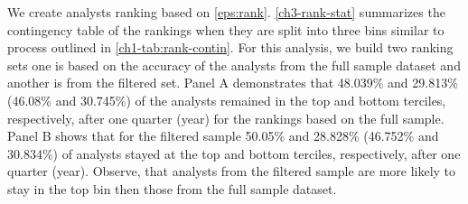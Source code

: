 We create analysts ranking  based on \vref{eps:rank}. \vref{ch3-rank-stat} summarizes the contingency table of the rankings when they are split into three bins similar to process outlined in \vref{ch1-tab:rank-contin}. For this analysis, we build two ranking sets one is based on the accuracy of the analysts from the full sample dataset and another is from the filtered set. Panel A demonstrates that 48.039\% and  29.813\% (46.08\% and  30.745\%) of the analysts  remained in the top and bottom terciles, respectively,  after one quarter (year) for the rankings based on the full sample. Panel B shows that for the filtered sample 50.05\% and  28.828\% (46.752\% and  30.834\%) of analysts stayed at the top and bottom terciles, respectively, after one quarter (year). Observe, that analysts from the filtered sample are more likely to stay in the top bin then those from the full sample dataset.


